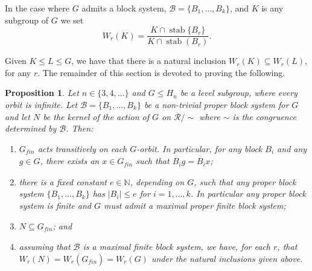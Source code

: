 \documentclass[11pt,a4paper]{amsart}
\newtheorem{proposition}[theorem]{Proposition}
\theoremstyle{definition}
\theoremstyle{remark}
\newcommand{\N}{\mathbb N}
\newcommand{\Ra}{\mathcal{R}}
\newcommand{\gfin}{G_{\textit{fin}}}
\newcommand{\stab}{\operatorname{stab}}
\begin{document}
In the case where $G$ admits a block system, $\mathcal{B} = \{ B_1, \ldots, B_k\}$, and $K$ is any subgroup of $G$ we set 
$$W_r(K)=\frac{K\cap\stab\{B_r\}}{K\cap\stab(B_r)}.$$ 


Given $K\le L\le G$, we have that there is a natural inclusion $W_r(K)\subseteq W_r(L)$, for any $r$. The remainder of this section is devoted to proving the following.


\begin{proposition} \label{6.1}
	Let $n\in \{3, 4, \ldots\}$ and $G\le H_n$ be a level subgroup, where every orbit is infinite. Let $\mathcal{B} = \{ B_1, \ldots, B_k\}$ be a non-trivial proper block system for $G$ and let $N$ be the kernel of the action of $G$ on $\Ra/\sim$ where $\sim$ is the congruence determined by $\mathcal{B}$. Then:
	\begin{enumerate}
		
		\item
		$\gfin$ acts transitively on each $G$-orbit. In particular, for any block $B_i$ and any $g \in G$, there exists an $x \in \gfin$ such that $B_ig=B_ix$;
		\item
		there is a fixed constant $e\in \N$, depending on $G$, such that any proper block system $\{B_1, \ldots, B_k\}$ has $|B_i|\le e$ for $i=1, \ldots, k$. In particular any proper block system is finite and $G$ must admit a maximal proper finite block system;
		\item
		$N\subseteq \gfin$; and
		\item assuming that $\mathcal{B}$ is a maximal finite block system, we have, for each $r$, that $W_r(N) = W_r(\gfin) = W_r(G)$ under the natural inclusions given above.
	\end{enumerate}
\end{proposition}
\end{document}
